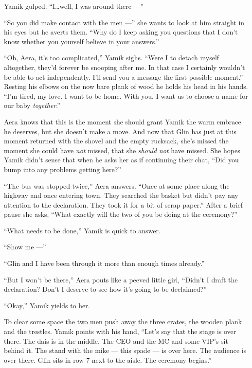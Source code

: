 \documentclass[twoside,11pt,openany]{book}
\begin{document}
Yamik gulped. ``I{\ldots}well, I was around there ---''

``So you did make contact with the men ---'' she wants to look at
him{ }straight in his eyes but he averts them. ``Why do I keep
asking you questions that I don't know whether you yourself believe in your answers.''

``Oh, Aera, it's too complicated,'' Yamik sighs. ``Were I to detach myself
altogether, they'd forever be snooping after me. In that case I certainly wouldn't be able to act independently. I'll
send you a message the first possible moment.'' Resting his elbows on the now bare plank of wood he holds
his head in his hands. ``I'm tired, my love. I want to be home. With you. I want
us{ }to choose a name for our baby \textit{together}.''

Aera knows that this is the moment she should grant Yamik the warm embrace he deserves, but she doesn't make a move. And
now that Glin has just at this moment returned with the shovel and the empty rucksack, she's missed the moment she
could have \textit{not} missed, that she \textit{should} \textit{not} have missed. She hopes Yamik didn't sense that
when he asks her as if continuing their chat, ``Did you bump into any problems getting
here?''

``The bus was stopped twice,'' Aera answers. ``Once at some place along the
highway and once entering town. They searched the basket but didn't pay any attention to the declaration. They took it
for a bit of scrap paper.'' After a brief pause she asks, ``What exactly will the two of you
be doing at the ceremony?''

``What needs to be done,'' Yamik is quick to answer.

``Show me ---''

``Glin and I have been through it more than enough times already.''

``But I won't be there,'' Aera pouts like a peeved little girl, ``Didn't I
draft the declaration? Don't I deserve to see how it's going to be declaimed?''

``Okay,'' Yamik yields to her.

To clear some space the two  men push away the three crates, the wooden plank and the
trestles{.} Yamik points with his hand, ``Let's say that the stage
is over there. The dais is in the middle. The CEO and the MC and some VIP's sit behind it. The stand with the mike
--- this spade --- is over here. The audience is over there. Glin sits in row 7 next to the aisle. The ceremony
begins.''
\end{document}
